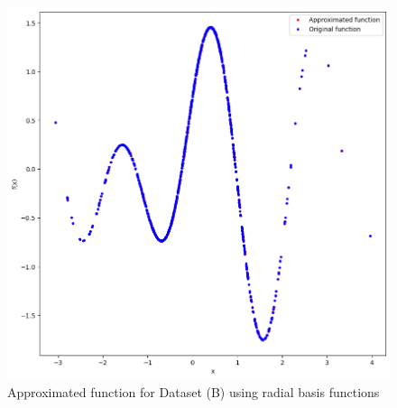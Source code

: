 \begin{itemize}
\begin{figure}[H]
    \centering
    \includegraphics[width=0.6\linewidth]{images/Ex5task1_3.png}
    \caption{Approximated function for Dataset (B) using radial basis functions}
    \label{ApproximatedB}
\end{figure}



\end{itemize}